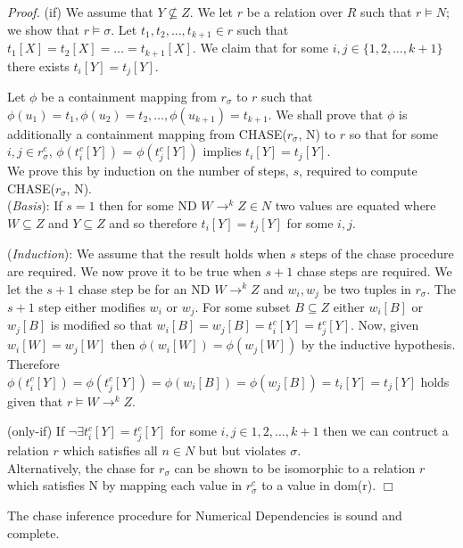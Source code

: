 {\em Proof.} (if) We assume that $Y \not\subseteq Z$. We let $r$ be a
relation over $R$ such that $r \models N$; we show that $r \models
\sigma$. Let $t_1, t_2, \ldots, t_{k+1} \in r$ such that $t_1[X] =
t_2[X] = \ldots = t_{k+1}[X]$. We claim that for some $i,
j \in \{1, 2, \ldots, {k+1}\}$ there exists $t_i[Y] = t_j[Y]$.

\smallskip
Let $\phi$ be a containment mapping from $r_\sigma$ to $r$ such that
$\phi(u_1) = t_1, \phi(u_2) = t_2, \ldots, \phi(u_{k+1}) = t_{k+1}$. We
shall prove that $\phi$ is additionally a containment mapping from
CHASE($r_\sigma$, N) to $r$ so that for some $i,j \in r_\sigma^c$,
$\phi(t_i^c[Y])$ = $\phi(t_j^c[Y])$ implies $t_i[Y] = t_j[Y]$.\\
\smallskip
We prove this by induction on the number of steps, $s$, required to compute
CHASE($r_\sigma$, N).\\

({\em Basis}):
If $s = 1$ then for some ND $W \to^k Z \in N$ two values are equated 
where $W \subseteq Z$ and $Y \subseteq Z$ and so therefore 
$t_i[Y] = t_j[Y]$ for some $i,j$.
\smallskip
 
({\em Induction}):
We assume that the result holds when $s$ steps of the chase procedure
are required. We now prove it to be true when $s+1$ chase steps are
required. We let the $s+1$ chase step be for an ND $W \to^k Z$ and
$w_i, w_j$ be two tuples in $r_\sigma$. The $s+1$ step either modifies
$w_i$ or $w_j$. For some subset $B \subseteq Z$ either $w_i[B]$ or
$w_j[B]$ is modified so that $w_i[B] = w_j[B] = t_i^c[Y] = t_j^c[Y]$.
Now, given $w_i[W] = w_j[W]$ then $\phi(w_i[W]) = \phi(w_j[W])$ by the
inductive hypothesis.  Therefore $\phi(t_i^c[Y]) = \phi(t_j^c[Y]) =
\phi(w_i[B]) = \phi(w_j[B]) = t_i[Y] = t_j[Y]$ holds given that $r
\models W \to^k Z$.\\

\smallskip

(only-if) If $\neg\exists t_i^c[Y] = t_j^c[Y]$ for some $i,j \in {1,2,
\ldots, k+1}$ then we can contruct a relation $r$ which satisfies all
$n \in N$ but but violates $\sigma$. \\

\smallskip
Alternatively, the chase for $r_\sigma$ can be shown to be isomorphic
to a relation $r$ which satisfies N by mapping each value in
$r_\sigma^c$ to a value in dom(r). $\Box$


\begin{theorem}\label{th:3}
\begin{rm}
The chase inference procedure for Numerical Dependencies is sound and complete.\end{rm}
\end{theorem}


